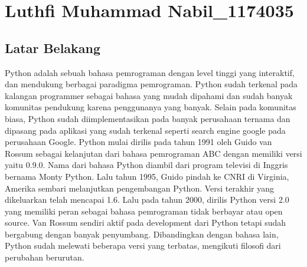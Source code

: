 \section{Luthfi Muhammad Nabil\_1174035}
\subsection{Latar Belakang}
Python adalah sebuah bahasa pemrograman dengan level tinggi yang interaktif, dan mendukung berbagai paradigma pemrograman. Python sudah terkenal pada kalangan 
programmer sebagai bahasa yang mudah dipahami dan sudah banyak komunitas pendukung karena penggunanya yang banyak. Selain pada komunitas biasa, Python 
sudah diimplementasikan pada banyak perusahaan ternama dan dipasang pada aplikasi yang sudah terkenal seperti search engine google pada perusahaan Google. 
Python mulai dirilis pada tahun 1991 oleh Guido van Rossum sebagai kelanjutan dari bahasa pemrograman ABC dengan memiliki versi yaitu 0.9.0. Nama dari bahasa Python diambil dari program televisi di Inggris bernama Monty Python. Lalu tahun 1995, Guido pindah ke CNRI di Virginia, Amerika sembari melanjutkan pengembangan Python. Versi terakhir yang dikeluarkan telah mencapai 1.6. 
Lalu pada tahun 2000, dirilis Python versi 2.0 yang memiliki peran sebagai bahasa pemrograman tidak berbayar atau open source. Van Rossum sendiri aktif pada development dari Python tetapi sudah bergabung dengan banyak penyumbang. Dibandingkan dengan bahasa lain, Python sudah melewati beberapa versi yang terbatas, mengikuti filosofi dari perubahan berurutan. 
